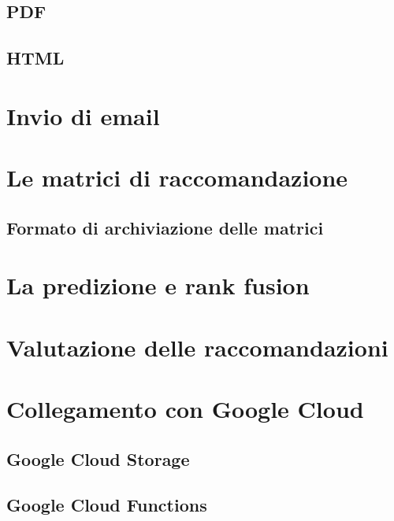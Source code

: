 \subsection{PDF}
\subsection{HTML}

\section{Invio di email}

\section{Le matrici di raccomandazione}
\subsection{Formato di archiviazione delle matrici}

\section{La predizione e rank fusion}

\section{Valutazione delle raccomandazioni}

\section{Collegamento con Google Cloud}
\subsection{Google Cloud Storage}
\subsection{Google Cloud Functions}
